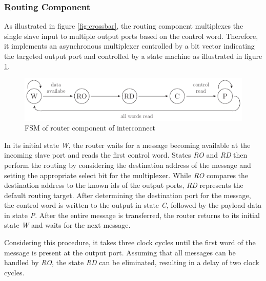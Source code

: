 \subsubsection{Routing Component}
As illustrated in figure \ref{fig:crossbar}, the routing component multiplexes
the single slave input to multiple output ports based on the control word.
Therefore, it implements an asynchronous multiplexer controlled by a bit
vector indicating the targeted output port and controlled by a state machine
as illustrated in figure \ref{fig:router_fsm}.
\begin{figure}[tb]
	\centering
	\includegraphics{../figures/router_fsm}
	\caption{\acs{FSM} of router component of interconnect}
	\label{fig:router_fsm}
\end{figure}
In its initial state \emph{W}, the router waits for a message becoming
available at the incoming slave port and reads the first control word. States
\emph{RO} and \emph{RD} then perform the routing by considering the
destination address of the message and setting the appropriate select bit for
the multiplexer. While \emph{RO} compares the destination address to the known
ids of the output ports, \emph{RD} represents the default routing target.
After determining the destination port for the message, the control word is
written to the output in state \emph{C}, followed by the payload data in state
\emph{P}. After the entire message is transferred, the router returns to its
initial state \emph{W} and waits for the next message.

Considering this procedure, it takes three clock cycles until the first word
of the message is present at the output port. Assuming that all messages can
be handled by \emph{RO}, the state \emph{RD} can be eliminated, resulting in a
delay of two clock cycles.

